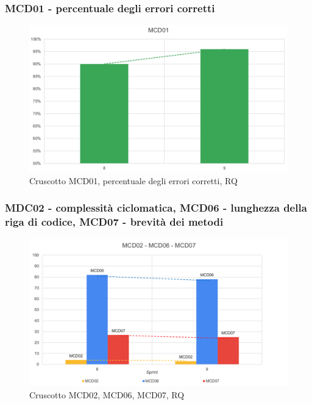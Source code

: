 \subsubsection*{MCD01 - percentuale degli errori corretti}
\begin{figure}[H] 
    \centering
    \includegraphics[scale = 0.6]{immagini/MCD01.png}
    \caption{Cruscotto MCD01, percentuale degli errori corretti, RQ}
\end{figure}

\subsubsection*{MDC02 - complessità ciclomatica, MCD06 - lunghezza della riga di codice, MCD07 - brevità dei metodi}
\begin{figure}[H] 
    \centering
    \includegraphics[scale = 0.65]{immagini/MCD02-06-07.png}
    \caption{Cruscotto MCD02, MCD06, MCD07, RQ}
\end{figure}

